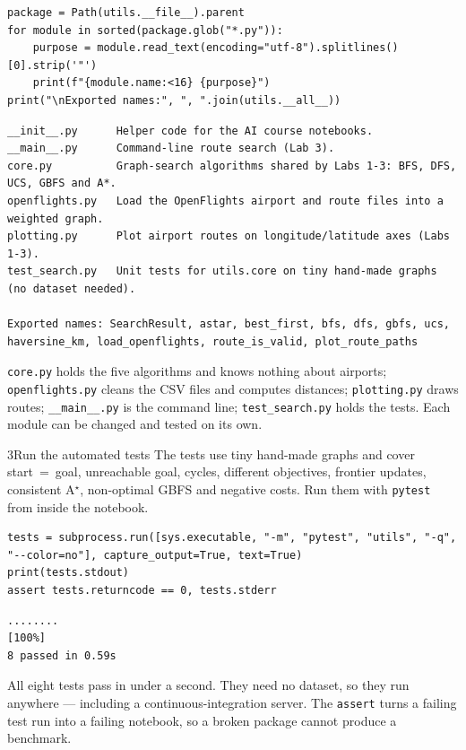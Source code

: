 \begin{labanswer}
\begin{lstlisting}[style=utppython]
package = Path(utils.__file__).parent
for module in sorted(package.glob("*.py")):
    purpose = module.read_text(encoding="utf-8").splitlines()[0].strip('"')
    print(f"{module.name:<16} {purpose}")
print("\nExported names:", ", ".join(utils.__all__))
\end{lstlisting}
\expectedoutput
\begin{lstlisting}[style=utpterminal]
__init__.py      Helper code for the AI course notebooks.
__main__.py      Command-line route search (Lab 3).
core.py          Graph-search algorithms shared by Labs 1-3: BFS, DFS, UCS, GBFS and A*.
openflights.py   Load the OpenFlights airport and route files into a weighted graph.
plotting.py      Plot airport routes on longitude/latitude axes (Labs 1-3).
test_search.py   Unit tests for utils.core on tiny hand-made graphs (no dataset needed).

Exported names: SearchResult, astar, best_first, bfs, dfs, gbfs, ucs, haversine_km, load_openflights, route_is_valid, plot_route_paths
\end{lstlisting}
\texttt{core.py} holds the five algorithms and knows nothing about airports; \texttt{openflights.py} cleans the CSV files and computes distances; \texttt{plotting.py} draws routes; \texttt{\_\_main\_\_.py} is the command line; \texttt{test\_search.py} holds the tests. Each module can be changed and tested on its own.
\end{labanswer}

\begin{labquestion}{3}{Run the automated tests}
The tests use tiny hand-made graphs and cover start~=~goal, unreachable goal, cycles, different objectives, frontier updates, consistent A$^\star$, non-optimal GBFS and negative costs. Run them with \texttt{pytest} from inside the notebook.
\end{labquestion}

\begin{labanswer}
\begin{lstlisting}[style=utppython]
tests = subprocess.run([sys.executable, "-m", "pytest", "utils", "-q", "--color=no"], capture_output=True, text=True)
print(tests.stdout)
assert tests.returncode == 0, tests.stderr
\end{lstlisting}
\expectedoutput
\begin{lstlisting}[style=utpterminal]
........                                                                 [100%]
8 passed in 0.59s
\end{lstlisting}
All eight tests pass in under a second. They need no dataset, so they run anywhere --- including a continuous-integration server. The \texttt{assert} turns a failing test run into a failing notebook, so a broken package cannot produce a benchmark.
\end{labanswer}

